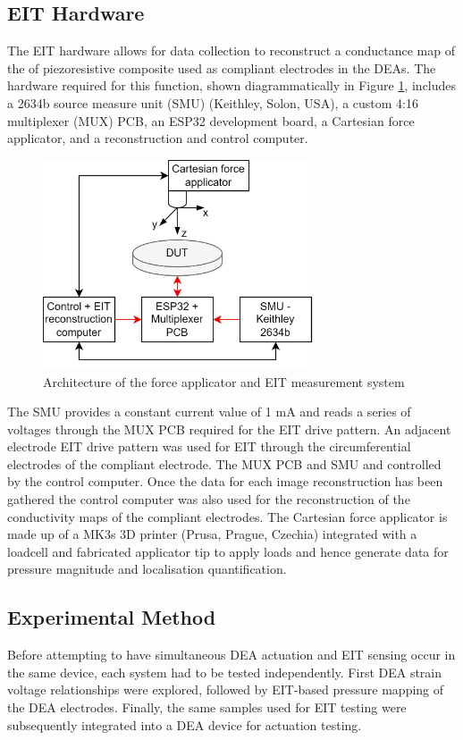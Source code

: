 	
	\subsection{EIT Hardware}
	\label{subsec:eit_hw}
	The EIT hardware allows for data collection to reconstruct a conductance map of the of piezoresistive composite used as compliant electrodes in the DEAs. The hardware required for this function, shown diagrammatically in Figure \ref{fig:ERT_MUX_CFA}, includes a 2634b source measure unit (SMU) (Keithley, Solon, USA), a custom 4:16 multiplexer (MUX) PCB, an ESP32 development board, a Cartesian force applicator, and a reconstruction and control computer. 
	\begin{figure}[H]
		\centering
		\includegraphics[width=8cm]{Figures/ERT_MUX_CFA_architecture.jpg}
        \vspace{0.2cm}
		\caption{Architecture of the force applicator and EIT measurement system \cite{Ellingham2024}}
		\label{fig:ERT_MUX_CFA}
	\end{figure}
	The SMU provides a constant current value of 1 mA and reads a series of voltages through the MUX PCB required for the EIT drive pattern. An adjacent electrode EIT drive pattern was used for EIT through the circumferential electrodes of the compliant electrode. The MUX PCB and SMU and controlled by the control computer. Once the data for each image reconstruction has been gathered the control computer was also used for the reconstruction of the conductivity maps of the compliant electrodes. The Cartesian force applicator is made up of a MK3s 3D printer (Prusa, Prague, Czechia) integrated with a loadcell and fabricated applicator tip to apply loads and hence generate data for pressure magnitude and localisation quantification.
	
	
	\subsection{Experimental Method}
	\label{subsec:experimental_method}
	Before attempting to have simultaneous DEA actuation and EIT sensing occur in the same device, each system had to be tested independently. First DEA strain voltage relationships were explored, followed by EIT-based pressure mapping of the DEA electrodes. Finally, the same samples used for EIT testing were subsequently integrated into a DEA device for actuation testing.
	
